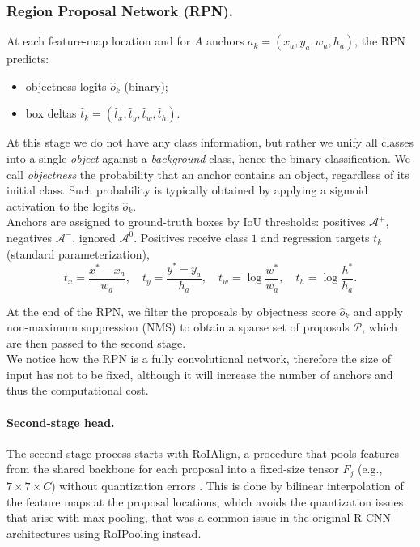 \subsubsection{Region Proposal Network (RPN).}
At each feature-map location and for $A$ anchors $a_k=(x_a,y_a,w_a,h_a)$, the RPN predicts:
\begin{itemize}
    \item objectness logits $\hat{o}_k$ (binary);
    \item box deltas $\hat{t}_k=(\hat{t}_x,\hat{t}_y,\hat{t}_w,\hat{t}_h)$.
\end{itemize}
At this stage we do not have any class information, but rather we unify all classes into a single \emph{object} against a \emph{background} class, hence the binary classification. We call \emph{objectness} the probability that an anchor contains an object, regardless of its initial class. Such probability is typically obtained by applying a sigmoid activation to the logits $\hat{o}_k$.\\
Anchors are assigned to ground-truth boxes by IoU thresholds: positives $\mathcal{A}^+$, negatives $\mathcal{A}^-$, ignored $\mathcal{A}^0$. Positives receive class $1$ and regression targets $t_k$ (standard parameterization),
$$
t_x=\frac{x^\ast-x_a}{w_a},\quad
t_y=\frac{y^\ast-y_a}{h_a},\quad
t_w=\log\frac{w^\ast}{w_a},\quad
t_h=\log\frac{h^\ast}{h_a}.
$$

At the end of the RPN, we filter the proposals by objectness score $\hat{o}_k$ and apply non-maximum suppression (NMS) to obtain a sparse set of proposals $\mathcal{P}$, which are then passed to the second stage.\\

We notice how the RPN is a fully convolutional network, therefore the size of input has not to be fixed, although it will increase the number of anchors and thus the computational cost.

\paragraph{Second-stage head.}
The second stage process starts with RoIAlign, a procedure that pools features from the shared backbone for each proposal into a fixed-size tensor $F_j$ (e.g., $7{\times}7{\times}C$) without quantization errors \cite{he2018maskrcnn}. This is done by bilinear interpolation of the feature maps at the proposal locations, which avoids the quantization issues that arise with max pooling, that was a common issue in the original R-CNN architectures using RoIPooling instead.

